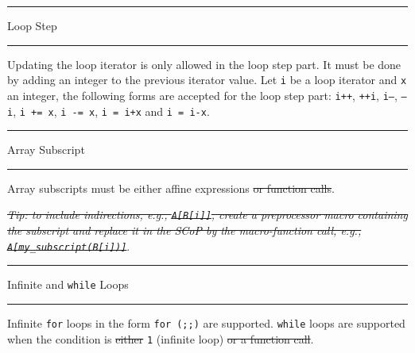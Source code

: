 \documentclass[landscape,a4paper]{article}
\def\titre#1{\begin{center}\hrule\vspace{0.1cm}#1
\vspace{0.07cm}\hrule\end{center}}
\begin{document}
\begin{multicols}{3}
\titre{Loop Step}

\begin{small}
Updating the loop iterator is only allowed in the loop step part.
It must be done by adding an integer to the previous
iterator value. Let {\tt i} be a loop iterator and {\tt x} an integer,
the following forms are accepted for the loop step part:
{\tt i++}, {\tt ++i}, {\tt i---}, {\tt ---i}, {\tt i += x}, {\tt i -= x}, {\tt i = i+x} and
{\tt i = i-x}.
\end{small}

\titre{Array Subscript}

\begin{small}
Array subscripts must be either affine expressions \sout{or function calls}.

\vspace{0.3cm}
\textit{\sout{Tip: to include indirections, e.g., {\tt A[B[i]]}, create a
preprocessor macro containing the subscript and replace it in the SCoP by
the macro-function call, e.g., {\tt A[my\_subscript(B[i])]}}}.
\end{small}

\titre{Infinite and {\tt while} Loops}

\begin{small}
Infinite {\tt for} loops in the form {\tt for (;;)} are supported.
{\tt while} loops are supported when the condition is \sout{either} {\tt 1}
(infinite loop) \sout{or a function call}.
\end{small}

\end{multicols}
\end{document}
